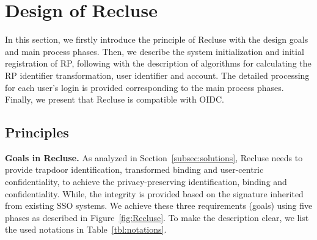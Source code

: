 \section{Design of Recluse}
\label{sec:Recluse}
In this section, we firstly introduce the principle of Recluse with the design goals and main process phases.
Then, we describe the system initialization and initial registration of RP, following with the description of algorithms for calculating the RP identifier transformation, user identifier and account.
The detailed processing for each user's login is provided corresponding to the main process phases.
Finally, we present that Recluse is compatible with OIDC.

\subsection{Principles}
\label{subsec:overview}
\noindent\textbf{Goals in Recluse.}
As analyzed in Section~\ref{subsec:solutions}, Recluse needs to provide trapdoor identification, transformed binding and user-centric confidentiality,
to achieve the privacy-preserving identification, binding and confidentiality.
While, the integrity is provided based on the signature inherited from existing SSO systems.
We %
achieve these three requirements (goals) using five phases as described in Figure~\ref{fig:Recluse}.
To make the description clear, we list the used notations  in Table~\ref{tbl:notations}.
